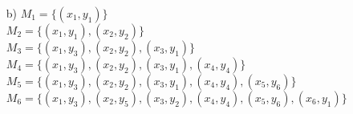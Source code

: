 \documentclass[a4paper,11pt]{article}
\begin{document}
\begin{enumerate}
\begin{enumerate}
    \item[b)]
        \( M_1 = \{ (x_1, y_1) \} \) \\
        \( M_2 = \{ (x_1, y_1), (x_2, y_2) \} \) \\
        \( M_3 = \{ (x_1, y_3), (x_2, y_2), (x_3, y_1) \} \) \\
        \( M_4 = \{ (x_1, y_3), (x_2, y_2), (x_3, y_1), (x_4, y_4) \} \) \\
        \( M_5 = \{ (x_1, y_3), (x_2, y_2), (x_3, y_1), (x_4, y_4), (x_5, y_6) \} \) \\
        \( M_6 = \{ (x_1, y_3), (x_2, y_5), (x_3, y_2), (x_4, y_4), (x_5, y_6), (x_6, y_1) \} \) \\

    \end{enumerate}
\end{enumerate}
\end{document}

